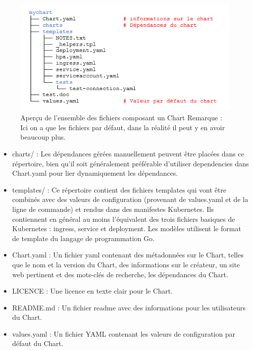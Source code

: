 \documentclass[11pt,fleqn]{book} %
\begin{document}
\begin{figure}[H]\centering
\renewcommand{\figurename}{Capture d'écran}
\includegraphics[scale=0.8]{Pictures/Comparaison/deployer/Kubernetes/helmChart.png}
\captionsetup{margin=1.5cm,format=hang,justification=justified}
\caption[]{Aperçu de l'ensemble des fichiers composant un Chart\newline
Remarque : Ici on a que les fichiers par défaut, dans la réalité il peut y en avoir beaucoup plus. \newline}
\end{figure}

\begin{itemize}
        \item charts/ : Les dépendances gérées manuellement peuvent être placées dans ce répertoire, bien qu'il soit généralement préférable d'utiliser dependencies dans Chart.yaml pour lier dynamiquement les dépendances.
        \item templates/ : Ce répertoire contient des fichiers templates qui vont être combinés avec des valeurs de configuration (provenant de values.yaml et de la ligne de commande) et rendus dans des manifestes Kubernetes. Ils contiennent en général au moins l'équivalent des trois fichiers basiques de Kubernetes : ingress, service et deployment. Les modèles utilisent le format de template du langage de programmation Go.
        \item Chart.yaml : Un fichier yaml contenant des métadonnées sur le Chart, telles que le nom et la version du Chart, des informations sur le créateur, un site web pertinent et des mots-clés de recherche, les dépendances du Chart.
      \item LICENCE : Une licence en texte clair pour le Chart.
     \item README.md : Un fichier readme avec des informations pour les utilisateurs du Chart.
      \item values.yaml : Un fichier YAML contenant les valeurs de configuration par défaut du Chart.\newline
\end{itemize} 
\end{document}
